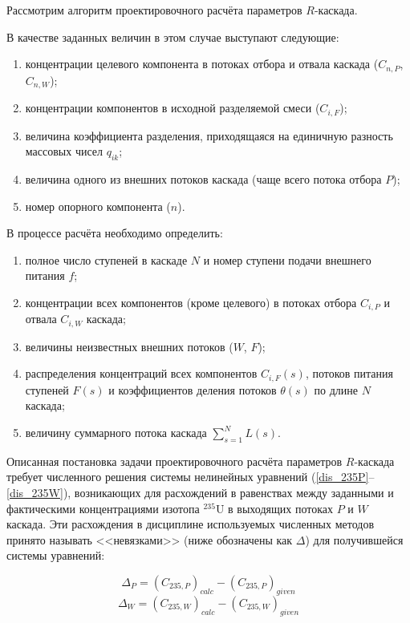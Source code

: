 Рассмотрим алгоритм проектировочного расчёта параметров $R$-каскада. 

В качестве заданных величин в этом случае выступают следующие:

\begin{enumerate}
  \item концентрации целевого компонента в потоках отбора и отвала каскада ($C_{n,P}$,$C_{n,W}$);
  \item концентрации компонентов в исходной разделяемой смеси ($C_{i,F}$);
  \item величина коэффициента разделения, приходящаяся на единичную разность массовых чисел $q_{ik}$;
  \item величина одного из внешних потоков каскада (чаще всего потока отбора $P$);
  \item номер опорного компонента ($n$).
\end{enumerate}


В процессе расчёта необходимо определить:


\begin{enumerate}
  \item полное число ступеней в каскаде $N$ и номер ступени подачи внешнего питания $f$;
  \item концентрации всех компонентов (кроме целевого) в потоках отбора $C_{i,P}$ и отвала $C_{i,W}$ каскада;
  \item величины неизвестных внешних потоков ($W$, $F$);
  \item распределения концентраций всех компонентов $C_{i,F}(s)$, потоков питания ступеней $F(s)$ и коэффициентов деления потоков $\theta(s)$ по длине $N$ каскада;
  \item величину суммарного потока каскада $\sum _{s=1}^{N}L(s)$.
\end{enumerate}

Описанная постановка задачи проектировочного расчёта параметров $R$-каскада требует численного решения системы нелинейных уравнений (\ref{dis_235P}--\ref{dis_235W}), возникающих для расхождений в равенствах между заданными и фактическими концентрациями изотопа $^{235}$U в выходящих потоках $P$ и $W$ каскада. Эти расхождения в дисциплине используемых численных методов принято называть <<невязками>> (ниже обозначены как $\Delta$) для получившейся системы уравнений: 

\begin{equation}
  \label{dis_235P}
  \Delta_{P} = {(C_{235, P})}_{calc}-{(C_{235, P})}_{given}
\end{equation}
\begin{equation}
  \label{dis_235W}
  \Delta_{W} = {(C_{235, W})}_{calc}-{(C_{235, W})}_{given}
\end{equation}

